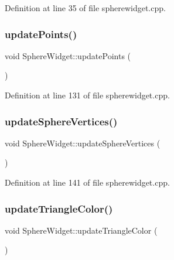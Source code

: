 Definition at line 35 of file spherewidget.\+cpp.

\mbox{\label{class_sphere_widget_a692ca1c1e7556f6abd7b5f6a49a2557c}} 
\subsubsection{\texorpdfstring{update\+Points()}{updatePoints()}}
{\footnotesize\ttfamily void Sphere\+Widget\+::update\+Points (\begin{DoxyParamCaption}{ }\end{DoxyParamCaption})}



Definition at line 131 of file spherewidget.\+cpp.

\mbox{\label{class_sphere_widget_a7d132800fb4d6b7b925c253679bb6445}} 
\subsubsection{\texorpdfstring{update\+Sphere\+Vertices()}{updateSphereVertices()}}
{\footnotesize\ttfamily void Sphere\+Widget\+::update\+Sphere\+Vertices (\begin{DoxyParamCaption}{ }\end{DoxyParamCaption})}



Definition at line 141 of file spherewidget.\+cpp.

\mbox{\label{class_sphere_widget_a871c5252a7a218c5d405be5dfc3dbfa1}} 
\subsubsection{\texorpdfstring{update\+Triangle\+Color()}{updateTriangleColor()}}
{\footnotesize\ttfamily void Sphere\+Widget\+::update\+Triangle\+Color (\begin{DoxyParamCaption}{ }\end{DoxyParamCaption})}



